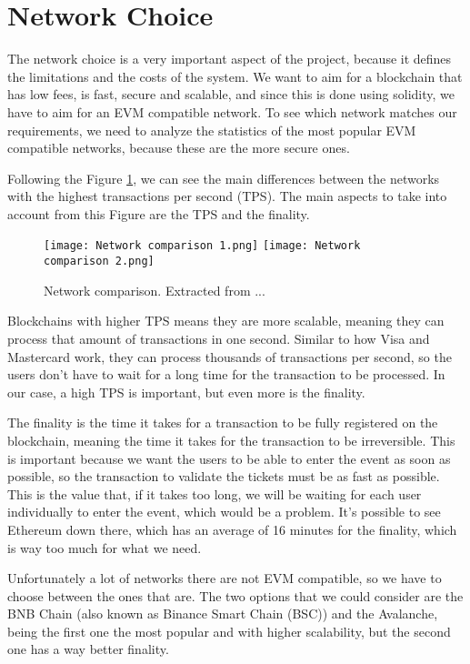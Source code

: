 \section{Network Choice}
\label{sec:network_choice}

The network choice is a very important aspect of the project, because it
defines the limitations and the costs of the system. We want to aim for a
blockchain that has low fees, is fast, secure and scalable, and since this is
done using solidity, we have to aim for an EVM compatible network. To see which
network matches our requirements, we need to analyze the statistics of the most
popular EVM compatible networks, because these are the more secure ones.

Following the Figure \ref{fig:network_comparison}, we can see the main
differences between the networks with the highest transactions per second
(TPS). The main aspects to take into account from this Figure are the TPS and
the finality.

\begin{figure}[H]
    \texttt{[image: Network comparison 1.png]}
    \texttt{[image: Network comparison 2.png]}
    \centering
    \caption{Network comparison. Extracted from ...}
    \label{fig:network_comparison}
\end{figure}

Blockchains with higher TPS means they are more scalable, meaning they can
process that amount of transactions in one second. Similar to how Visa and
Mastercard work, they can process thousands of transactions per second, so the
users don't have to wait for a long time for the transaction to be processed.
In our case, a high TPS is important, but even more is the finality.

The finality is the time it takes for a transaction to be fully registered on
the blockchain, meaning the time it takes for the transaction to be
irreversible. This is important because we want the users to be able to enter
the event as soon as possible, so the transaction to validate the tickets must
be as fast as possible. This is the value that, if it takes too long, we will
be waiting for each user individually to enter the event, which would be a
problem. It's possible to see Ethereum down there, which has an average of 16
minutes for the finality, which is way too much for what we need.

Unfortunately a lot of networks there are not EVM compatible, so we have to
choose between the ones that are. The two options that we could consider are
the BNB Chain (also known as Binance Smart Chain (BSC)) and the Avalanche,
being the first one the most popular and with higher scalability, but the
second one has a way better finality.

